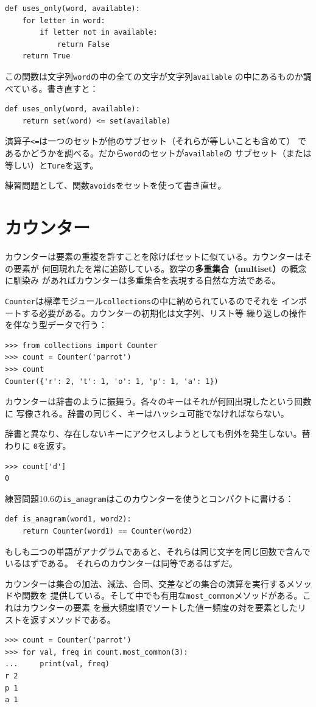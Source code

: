 \documentclass[a4j,12pt,makeidx]{jbook}
\begin{document}
\begin{verbatim}
def uses_only(word, available):
    for letter in word: 
        if letter not in available:
            return False
    return True
\end{verbatim}
この関数は文字列{\tt word}の中の全ての文字が文字列{\tt available}
の中にあるものか調べている。書き直すと：
\begin{verbatim}
def uses_only(word, available):
    return set(word) <= set(available)
\end{verbatim}
演算子{\tt <=}は一つのセットが他のサブセット（それらが等しいことも含めて）
であるかどうかを調べる。だから{\tt word}のセットが{\tt available}の
サブセット（または等しい）と{\tt Ture}を返す。\par
練習問題として、関数{\tt avoids}をセットを使って書き直せ。
%
\section{カウンター}
カウンターは要素の重複を許すことを除けばセットに似ている。カウンターはその要素が
何回現れたを常に追跡している。数学の{\bf 多重集合（multiset）}の概念に馴染み
があればカウンターは多重集合を表現する自然な方法である。\par
{\tt Counter}は標準モジュール{\tt collections}の中に納められているのでそれを
インポートする必要がある。カウンターの初期化は文字列、リスト等
繰り返しの操作を伴なう型データで行う：
\begin{verbatim}
>>> from collections import Counter
>>> count = Counter('parrot')
>>> count
Counter({'r': 2, 't': 1, 'o': 1, 'p': 1, 'a': 1})
\end{verbatim}
カウンターは辞書のように振舞う。各々のキーはそれが何回出現したという回数に
写像される。辞書の同じく、キーはハッシュ可能でなければならない。\par
辞書と異なり、存在しないキーにアクセスしようとしても例外を発生しない。替わりに
{\tt 0}を返す。
\begin{verbatim}
>>> count['d']
0
\end{verbatim}
練習問題10.6の{\tt is\_anagram}はこのカウンターを使うとコンパクトに書ける：
\begin{verbatim}
def is_anagram(word1, word2):
    return Counter(word1) == Counter(word2)
\end{verbatim}
もしも二つの単語がアナグラムであると、それらは同じ文字を同じ回数で含んでいるはずである。
それらのカウンターは同等であるはずだ。\par
カウンターは集合の加法、減法、合同、交差などの集合の演算を実行するメソッドや関数を
提供している。そして中でも有用な{\tt most\_common}メソッドがある。これはカウンターの要素
を最大頻度順でソートした値ー頻度の対を要素としたリストを返すメソッドである。
\begin{verbatim}
>>> count = Counter('parrot')
>>> for val, freq in count.most_common(3):
...     print(val, freq)
r 2
p 1
a 1
\end{verbatim}
%
\end{document}
